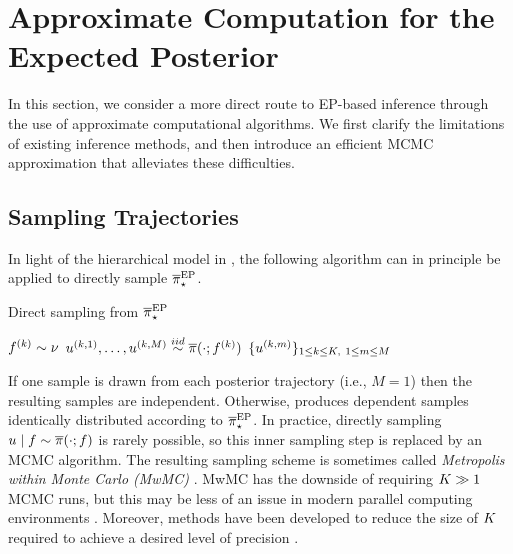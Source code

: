 \documentclass[12pt]{article}
\begin{document}
\section{Approximate Computation for the Expected Posterior} \label{sec:computation}
In this section, we consider a more direct route to EP-based inference through
the use of approximate computational algorithms. 
We first clarify the limitations of existing inference methods, 
and then introduce an efficient MCMC approximation that alleviates 
these difficulties.

\subsection{Sampling Trajectories}
In light of the hierarchical model in , the following 
algorithm can in principle be applied to directly sample ${\overline{\pi}}_{\star}^{\mathrm{EP}}$.  

\begin{algorithm}[H]
    \caption{Direct sampling from ${\overline{\pi}}_{\star}^{\mathrm{EP}}$}
    \label{alg:ep}
    \begin{algorithmic}[1]
        		\State $f^{(k)} \sim \nu$ 
		\State $u^{(k, 1)}, \dots, u^{(k, M)} \overset{iid}{\sim} \overline{\pi}(\cdot; f^{(k)})$ 
	\EndFor
	\State \Return $\{u^{(k, m)}\}_{1 \leq k \leq K, \ 1 \leq m \leq M}$
	\EndFunction
    \end{algorithmic}
\end{algorithm}
If one sample is drawn from each posterior trajectory (i.e., $M=1$) then the resulting samples are 
independent. Otherwise,  produces dependent samples identically distributed according to
${\overline{\pi}}_{\star}^{\mathrm{EP}}$. In practice, directly sampling $u \mid f \sim \overline{\pi}(\cdot; f)$
is rarely possible, so this inner sampling step is replaced by an MCMC algorithm.
The resulting sampling scheme is sometimes called \textit{Metropolis within Monte Carlo (MwMC)} 
\citep{garegnani2021NoisyMCMC}. MwMC has the downside of requiring $K \gg 1$
MCMC runs, but this may be less of an issue in modern parallel computing environments \citep{BurknerSurrogate}. 
Moreover, methods have been developed to reduce the size of $K$ required to achieve a
desired level of precision \citep{BurknerTwoStep}. 
\end{document}
